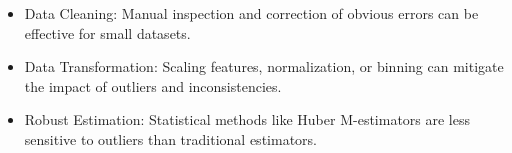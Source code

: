 \begin{itemize}
\begin{itemize}
                \item Data Cleaning: Manual inspection and correction of obvious errors can be effective for small datasets.
                \item Data Transformation: Scaling features, normalization, or binning can mitigate the impact of outliers and inconsistencies.
                \item Robust Estimation: Statistical methods like Huber M-estimators are less sensitive to outliers than traditional estimators.
            \end{itemize}
    \end{itemize}